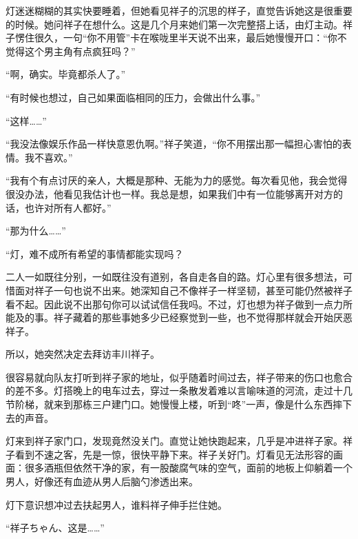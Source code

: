 \documentclass{article}
\begin{document}
灯迷迷糊糊的其实快要睡着，但她看见祥子的沉思的样子，直觉告诉她这是很重要的时候。她问祥子在想什么。这是几个月来她们第一次完整搭上话，由灯主动。祥子愣住很久，一句“你不用管”卡在喉咙里半天说不出来，最后她慢慢开口：“你不觉得这个男主角有点疯狂吗？”



“啊，确实。毕竟都杀人了。”



“有时候也想过，自己如果面临相同的压力，会做出什么事。”



“这样……”



“我没法像娱乐作品一样快意恩仇啊。”祥子笑道，“你不用摆出那一幅担心害怕的表情。我不喜欢。”



“我有个有点讨厌的亲人，大概是那种、无能为力的感觉。每次看见他，我会觉得很没办法，他看见我估计也一样。我总是想，如果我们中有一位能够离开对方的话，也许对所有人都好。”



“那为什么……”



“灯，难不成所有希望的事情都能实现吗？



二人一如既往分别，一如既往没有道别，各自走各自的路。灯心里有很多想法，可惜面对祥子一句也说不出来。她深知自己不像祥子一样坚韧，甚至可能仍然被祥子看不起。因此说不出那句你可以试试信任我吗。不过，灯也想为祥子做到一点力所能及的事。祥子藏着的那些事她多少已经察觉到一些，也不觉得那样就会开始厌恶祥子。



所以，她突然决定去拜访丰川祥子。



很容易就向队友打听到祥子家的地址，似乎随着时间过去，祥子带来的伤口也愈合的差不多。灯搭晚上的电车过去，穿过一条散发着难以言喻味道的河流，走过十几节阶梯，就来到那栋三户建门口。她慢慢上楼，听到“咚”一声，像是什么东西摔下去的声音。



灯来到祥子家门口，发现竟然没关门。直觉让她快跑起来，几乎是冲进祥子家。祥子看到不速之客，先是一惊，很快平静下来。祥子关好门。灯看见无法形容的画面：很多酒瓶但依然干净的家，有一股酸腐气味的空气，面前的地板上仰躺着一个男人，好像还有血迹从男人后脑勺渗透出来。



灯下意识想冲过去扶起男人，谁料祥子伸手拦住她。



“祥子ちゃん、这是……”
\end{document}
